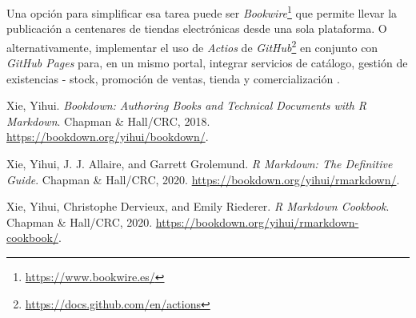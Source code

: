 \documentclass[
]{krantz}
\DeclareRobustCommand{\href}[2]{#2\footnote{\url{#1}}}
\begin{document}
Una opción para simplificar esa tarea puede ser \href{https://www.bookwire.es/}{\emph{Bookwire}} que permite llevar la publicación a centenares de tiendas electrónicas desde una sola plataforma. O alternativamente, implementar el uso de \href{https://docs.github.com/en/actions}{\emph{Actios} de \emph{GitHub}} en conjunto con \emph{GitHub Pages} para, en un mismo portal, integrar servicios de catálogo, gestión de existencias - stock, promoción de ventas, tienda y comercialización \citep{seminariopublicacionesdigitalesUnidad2021}.

Xie, Yihui. \emph{Bookdown: Authoring Books and Technical Documents with R Markdown}. Chapman \& Hall/CRC, 2018. \url{https://bookdown.org/yihui/bookdown/}.

Xie, Yihui, J. J. Allaire, and Garrett Grolemund. \emph{R Markdown: The Definitive Guide}. Chapman \& Hall/CRC, 2020. \url{https://bookdown.org/yihui/rmarkdown/}.

Xie, Yihui, Christophe Dervieux, and Emily Riederer. \emph{R Markdown Cookbook}. Chapman \& Hall/CRC, 2020. \url{https://bookdown.org/yihui/rmarkdown-cookbook/}.

  
\end{document}
